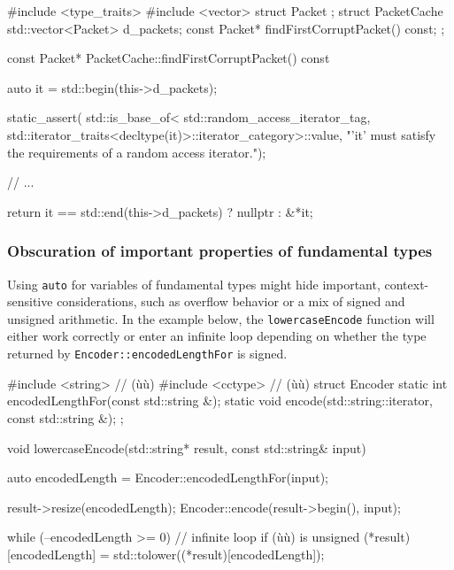 \begin{emcppshiddenlisting}[emcppsbatch=e19]
#include <type_traits>
#include <vector>
struct Packet {};
struct PacketCache {
    std::vector<Packet> d_packets;
    const Packet* findFirstCorruptPacket() const;
};
\end{emcppshiddenlisting}
\begin{emcppslisting}[emcppsbatch=e19]
const Packet* PacketCache::findFirstCorruptPacket() const
{
    auto it = std::begin(this->d_packets);

    static_assert(
        std::is_base_of<
            std::random_access_iterator_tag,
            std::iterator_traits<decltype(it)>::iterator_category>::value,
        "'it' must satisfy the requirements of a random access iterator.");

    // ...

    return it == std::end(this->d_packets) ? nullptr : &*it;
}
\end{emcppslisting}


\subsubsection[Obscuration of important properties of fundamental types]{Obscuration of important properties of fundamental types}\label{obscuration-of-important-properties-of-fundamental-types}

Using \lstinline!auto! for variables of fundamental types might hide
important, context-sensitive considerations, such as overflow behavior
or a mix of signed and unsigned arithmetic. In the example below, the
\lstinline!lowercaseEncode! function will either work correctly or enter an
infinite loop depending on whether the type returned by
\lstinline!Encoder::encodedLengthFor! is signed.

\begin{emcppshiddenlisting}[emcppsbatch=e20]
#include <string>  // (ù{}ù)
#include <cctype>  // (ù{}ù)
struct Encoder {
    static int encodedLengthFor(const std::string &);
    static void encode(std::string::iterator, const std::string &);
};
\end{emcppshiddenlisting}
\begin{emcppslisting}[emcppsbatch=e20]
void lowercaseEncode(std::string* result, const std::string& input)
{
    auto encodedLength = Encoder::encodedLengthFor(input);

    result->resize(encodedLength);
    Encoder::encode(result->begin(), input);

    while (--encodedLength >= 0)  // infinite loop if (ù{}ù) is unsigned
    {
        (*result)[encodedLength] = std::tolower((*result)[encodedLength]);
    }
}
\end{emcppslisting}


